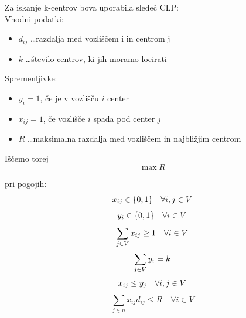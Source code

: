 \documentclass[a4paper]{article}
\begin{document}
\vspace{\baselineskip}
\parindent 0mm
Za iskanje k-centrov bova uporabila sledeč CLP:\\

Vhodni podatki:
\begin{itemize}
\item{$d_{ij}$ \dots razdalja med vozliščem i in centrom j}
\item{$k$ \dots število centrov, ki jih moramo locirati}
\end{itemize}

Spremenljivke:
\begin{itemize}
\item{$y_{i}=1$, če je v vozlišču $i$ center}
\item{$x_{ij}= 1$, če vozlišče $i$ spada pod center $j$}
\item{$R$ \dots maksimalna razdalja med vozliščem in najbližjim centrom}
\end{itemize}

\cleardoublepage

Iščemo torej\\
$$\max R$$

pri pogojih:
$$x_{ij} \in \{0,1\} \quad\forall i,j \in V\\$$
$$y_{i} \in \{0,1\} \quad\forall i \in V \\$$
$$\sum_{j \in V} x_{ij} \geq 1 \quad \forall i \in V \\$$
$$\sum_{j \in V} y_{i} = k \\$$
$$x_{ij} \leq y_{j} \quad \forall i,j \in V \\$$
$$\sum_{j \in n} x_{ij} d_{ij} \leq R \quad\forall i \in V $$


\end{document}
